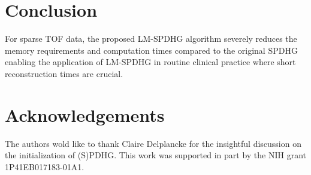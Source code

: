 \section{Conclusion}

For sparse TOF data, the proposed LM-SPDHG algorithm severely reduces the memory requirements 
and computation times compared to the original SPDHG enabling the application of LM-SPDHG 
in routine clinical practice where short reconstruction times are crucial.


\section*{Acknowledgements}

The authors wold like to thank Claire Delplancke for the insightful discussion on the
initialization of (S)PDHG.
This work was supported in part by the NIH grant 1P41EB017183-01A1.

